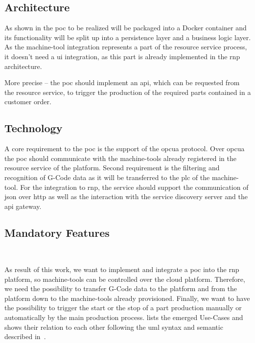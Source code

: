 \documentclass[
a4paper,
twoside,
headsepline,
cleardoublepage=empty,
parskip=half,
draft=false
]{scrbook}
\begin{document}
			\subsection{Architecture} \label{subsec:architecture}

				As shown in  the \gls{poc} to be realized will be packaged into a Docker container and its functionality will be split up into a persistence layer and a business logic layer.
				As the machine-tool integration represents a part of the resource service process, it doesn't need a \gls{ui} integration, as this part is already implemented in the \gls{rnp} architecture.

				More precise -- the \gls{poc} should implement an \gls{api}, which can be requested from the resource service, to trigger the production of the required parts contained in a customer order.

			\subsection{Technology} \label{subsec:technology}

				A core requirement to the \gls{poc} is the support of the \gls{opcua} protocol.
				Over \gls{opcua} the \gls{poc} should communicate with the machine-tools already registered in the resource service of the platform.
				Second requirement is the filtering and recognition of G-Code data as it will be transferred to the \gls{plc} of the machine-tool.
				For the integration to \gls{rnp}, the service should support the communication of \gls{json} over \gls{http} as well as the interaction with the service discovery server and the \gls{api} gateway.

			\subsection{Mandatory Features} \label{subsec:mandatory}

				As result of this work, we want to implement and integrate a \gls{poc} into the \gls{rnp} platform, so machine-tools can be controlled over the cloud platform.
				Therefore, we need the possibility to transfer G-Code data to the platform and from the platform down to the machine-tools already provisioned.
				Finally, we want to have the possibility to trigger the start or the stop of a part production manually or automatically by the main production process.  lists the emerged Use-Cases and shows their relation to each other following the \gls{uml} syntax and semantic described in~\cite{uml2017}.
\end{document}
